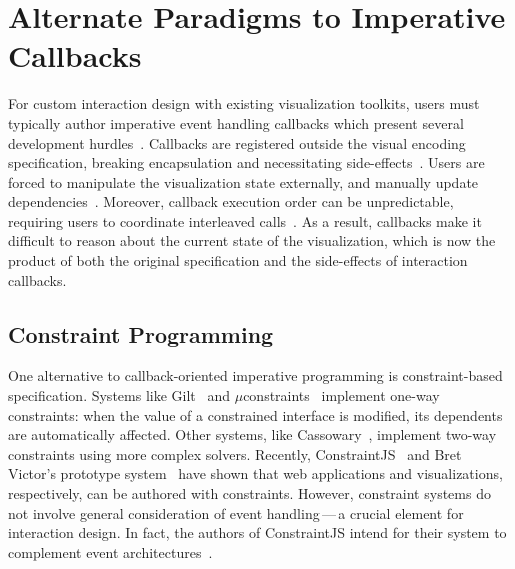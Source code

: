 \vspace{-10pt}

\section{Alternate Paradigms to Imperative Callbacks}

\vspace{-10pt}

For custom interaction design with existing visualization toolkits, users must
typically author imperative event handling callbacks which present several
development hurdles~\cite{myers:callbacks}. Callbacks are registered outside the
visual encoding specification, breaking encapsulation and necessitating
side-effects~\cite{cooper:integrating}. Users are forced to manipulate the
visualization state externally, and manually update
dependencies~\cite{cooper:embedding}. Moreover, callback execution order can be
unpredictable, requiring users to coordinate interleaved
calls~\cite{edwards:coherent}. As a result, callbacks make it difficult to
reason about the current state of the visualization, which is now the product of
both the original specification and the side-effects of interaction callbacks.

\vspace{-10pt}

\subsection{Constraint Programming}

\vspace{-7pt}

One alternative to callback-oriented imperative programming is constraint-based
specification. Systems like Gilt~\cite{myers:callbacks} and
$\mu$constraints~\cite{hudson:constraints} implement one-way constraints: when
the value of a constrained interface is modified, its dependents are
automatically affected. Other systems, like Cassowary~\cite{badros:cassowary},
implement two-way constraints using more complex solvers. Recently,
ConstraintJS~\cite{oney:constraintjs} and Bret Victor's prototype
system~\cite{victor:drawing} have shown that web applications and
visualizations, respectively, can be authored with constraints. However,
constraint systems do not involve general consideration of event
handling\,---\,a crucial element for interaction design. In fact, the authors of
ConstraintJS intend for their system to complement event
architectures~\cite{oney:constraintjs}.

